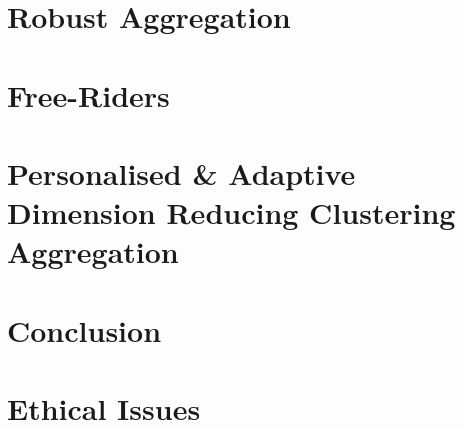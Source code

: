 \documentclass[12pt,twoside]{report}
\begin{document}
\chapter{Robust Aggregation}


\chapter{Free-Riders}


\chapter[FedPADRC]{Personalised \& Adaptive Dimension Reducing Clustering Aggregation}


\chapter{Conclusion}


\chapter{Ethical Issues}





\begin{appendices}

\end{appendices}
\end{document}
